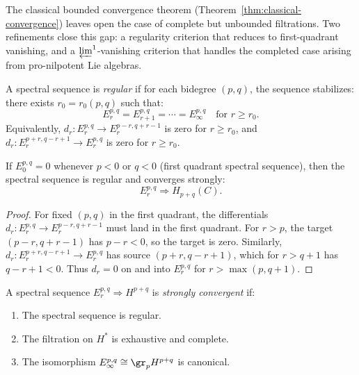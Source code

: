 The classical bounded convergence theorem
(Theorem~\ref{thm:classical-convergence}) leaves open the case of
complete but unbounded filtrations. Two refinements close this gap: a
regularity criterion that reduces to first-quadrant vanishing, and a
$\varprojlim^1$-vanishing criterion that handles the completed case
arising from pro-nilpotent Lie algebras.

\begin{definition}
\label{def:regular-ss}
A spectral sequence is \emph{regular} if for each bidegree $(p, q)$, the
sequence stabilizes: there exists $r_0 = r_0(p, q)$ such that:
\[
E_r^{p,q} = E_{r+1}^{p,q} = \cdots = E_\infty^{p,q} \quad \text{for } r \geq r_0.
\]
Equivalently, $d_r: E_r^{p,q} \to E_r^{p-r, q+r-1}$ is zero for $r \geq r_0$,
and $d_r: E_r^{p+r, q-r+1} \to E_r^{p,q}$ is zero for $r \geq r_0$.
\end{definition}

\begin{proposition}
\label{prop:first-quadrant}
If $E_0^{p,q} = 0$ whenever $p < 0$ or $q < 0$ (first quadrant spectral sequence),
then the spectral sequence is regular and converges strongly:
\[
E_r^{p,q} \Rightarrow H_{p+q}(C).
\]
\end{proposition}

\begin{proof}
For fixed $(p, q)$ in the first quadrant, the differentials $d_r: E_r^{p,q} \to
E_r^{p-r, q+r-1}$ must land in the first quadrant. For $r > p$, the target
$(p-r, q+r-1)$ has $p - r < 0$, so the target is zero. Similarly,
$d_r: E_r^{p+r, q-r+1} \to E_r^{p,q}$ has source $(p+r, q-r+1)$, which for
$r > q+1$ has $q - r + 1 < 0$. Thus $d_r = 0$ on and into $E_r^{p,q}$ for
$r > \max(p, q+1)$.
\end{proof}

\begin{definition}
\label{def:strong-convergence}
A spectral sequence $E_r^{p,q} \Rightarrow H^{p+q}$ is \emph{strongly convergent}
if:
\begin{enumerate}[label=(\roman*)]
\item The spectral sequence is regular.
\item The filtration on $H^*$ is exhaustive and complete.
\item The isomorphism $E_\infty^{p,q} \cong \gr_p H^{p+q}$ is canonical.
\end{enumerate}
\end{definition}

